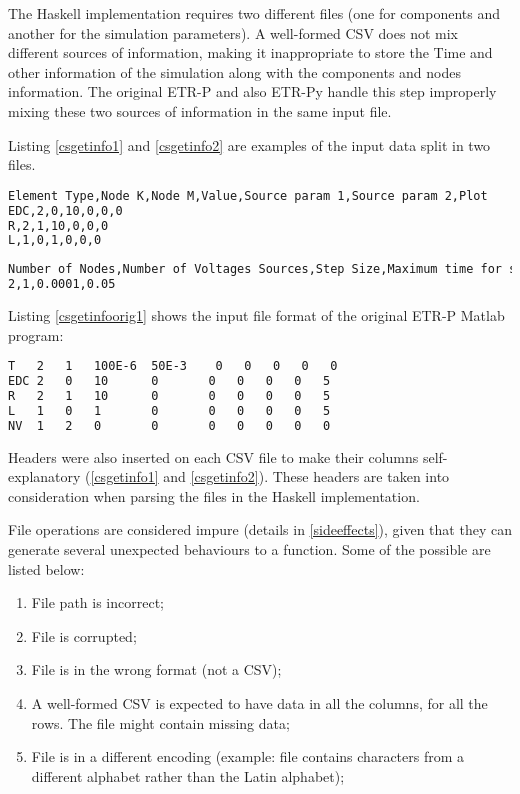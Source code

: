 The Haskell implementation requires two different files (one for components and another for the simulation parameters). A well-formed CSV does not mix different sources of information, making it inappropriate to store the Time and other information of the simulation along with the components and nodes information. The original ETR-P and also ETR-Py handle this step improperly mixing these two sources of information in the same input file.

Listing \ref{csgetinfo1} and \cref{csgetinfo2} are examples of the input data split in two files.

\begin{lstlisting}[language=bash, label=csgetinfo1, caption={Input data file for components}, captionpos=b]
Element Type,Node K,Node M,Value,Source param 1,Source param 2,Plot
EDC,2,0,10,0,0,0 
R,2,1,10,0,0,0
L,1,0,1,0,0,0
\end{lstlisting}


\begin{lstlisting}[language=bash, label=csgetinfo2, caption={Input data file for time and simulation data}, captionpos=b]
Number of Nodes,Number of Voltages Sources,Step Size,Maximum time for simulation
2,1,0.0001,0.05
\end{lstlisting}

Listing \ref{csgetinfoorig1} shows the input file format of the original ETR-P Matlab program:

\begin{lstlisting}[language=bash, label=csgetinfoorig1, caption={Original input data file for ETR-P Matlab}, captionpos=b]
T   2   1   100E-6  50E-3    0   0   0   0   0
EDC 2   0   10      0       0   0   0   0   5
R   2   1   10      0       0   0   0   0   5
L   1   0   1       0       0   0   0   0   5
NV  1   2   0       0       0   0   0   0   0
\end{lstlisting}


Headers were also inserted on each CSV file to make their columns self-explanatory (\cref{csgetinfo1} and \cref{csgetinfo2}). These headers are taken into consideration when parsing the files in the Haskell implementation.


File operations are considered impure (details in \cref{sideeffects}), given that they can generate several unexpected behaviours to a function. Some of the possible are listed below:

\begin{enumerate}\label{impureprobl1}
  \item File path is incorrect;
  \item File is corrupted;
  \item File is in the wrong format (not a CSV);
  \item A well-formed CSV is expected to have data in all the columns, for all the rows. The file might contain missing data;
  \item File is in a different encoding (example: file contains characters from a different alphabet rather than the Latin alphabet);
\end{enumerate}

